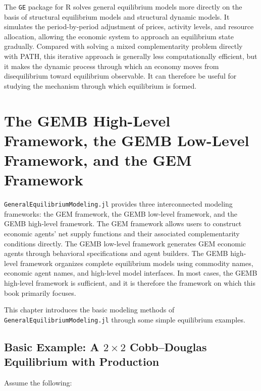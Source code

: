\documentclass[
  letterpaper,
  DIV=11,
  numbers=noendperiod]{scrreprt}
\begin{document}
The \texttt{GE} package for R solves general equilibrium models more
directly on the basis of structural equilibrium models and structural
dynamic models. It simulates the period-by-period adjustment of prices,
activity levels, and resource allocation, allowing the economic system
to approach an equilibrium state gradually. Compared with solving a
mixed complementarity problem directly with PATH, this iterative
approach is generally less computationally efficient, but it makes the
dynamic process through which an economy moves from disequilibrium
toward equilibrium observable. It can therefore be useful for studying
the mechanism through which equilibrium is formed.


\chapter{The GEMB High-Level Framework, the GEMB Low-Level Framework,
and the GEM
Framework}\label{the-gemb-high-level-framework-the-gemb-low-level-framework-and-the-gem-framework}

\texttt{GeneralEquilibriumModeling.jl} provides three interconnected
modeling frameworks: the GEM framework, the GEMB low-level framework,
and the GEMB high-level framework. The GEM framework allows users to
construct economic agents' net supply functions and their associated
complementarity conditions directly. The GEMB low-level framework
generates GEM economic agents through behavioral specifications and
agent builders. The GEMB high-level framework organizes complete
equilibrium models using commodity names, economic agent names, and
high-level model interfaces. In most cases, the GEMB high-level
framework is sufficient, and it is therefore the framework on which this
book primarily focuses.

This chapter introduces the basic modeling methods of
\texttt{GeneralEquilibriumModeling.jl} through some simple equilibrium
examples.

\section{\texorpdfstring{Basic Example: A \(2\times2\) Cobb--Douglas
Equilibrium with
Production}{Basic Example: A 2\textbackslash times2 Cobb--Douglas Equilibrium with Production}}\label{basic-example-a-2times2-cobbdouglas-equilibrium-with-production}

Assume the following:
\end{document}
